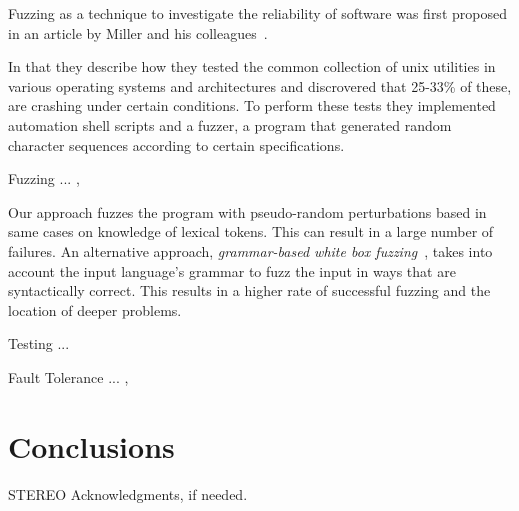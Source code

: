 \documentclass[10pt]{sigplanconf}
\begin{document}
Fuzzing as a technique to investigate the reliability of software
was first proposed in an article by Miller and his colleagues~\cite{MFS90}.

In that they describe how they tested the common collection of {\sc unix}
utilities in various operating systems and architectures and discrovered that
25-33\% of these, are crashing under certain conditions. To perform these tests
they implemented automation shell scripts and a fuzzer, a program that generated
random character sequences according to certain specifications.

Fuzzing ... \cite{TJC08}, \cite{WWGZ11}

Our approach fuzzes the program with pseudo-random
perturbations based in same cases on knowledge of
lexical tokens.
This can result in a large number of failures.
An alternative approach, {\em grammar-based white box fuzzing}~\cite{God08},
takes into account the input language's grammar to fuzz the input in
ways that are syntactically correct.
This results in a higher rate of successful fuzzing and the location
of deeper problems.

Testing ... \cite{HAM06}

Fault Tolerance ... \cite{KOKR07}, \cite{LYU95}

\section{Conclusions} %
\label{sec:conclusions}


\acks

STEREO
Acknowledgments, if needed.








\end{document}

